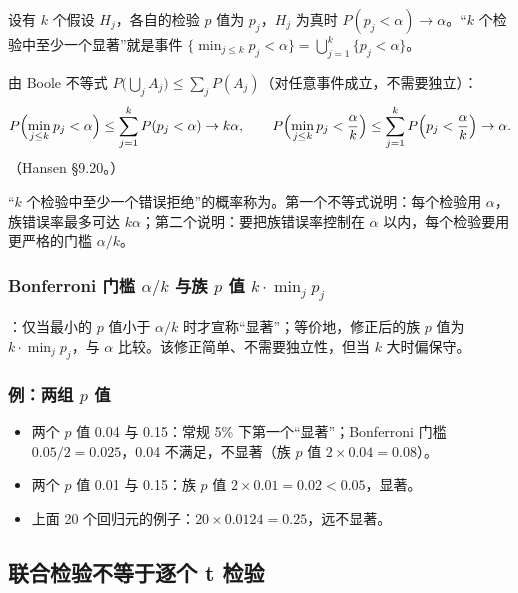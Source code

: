 设有 $k$ 个假设 $H_j$，各自的检验 $p$ 值为 $p_j$，$H_j$ 为真时 $P(p_j<\alpha)\to\alpha$。“$k$ 个检验中至少一个显著”就是事件 $\{\min_{j\le k}p_j<\alpha\}=\bigcup_{j=1}^k\{p_j<\alpha\}$。

\begin{thm}[Bonferroni 界]\label{thm:U06b-bonf}
由 Boole 不等式 $P\bigl(\bigcup_jA_j\bigr)\le\sum_jP(A_j)$（对任意事件成立，不需要独立）：
\[
P\Bigl(\min_{j\le k}p_j<\alpha\Bigr)\le\sum_{j=1}^kP(p_j<\alpha)\to k\alpha,\qquad
P\Bigl(\min_{j\le k}p_j<\frac{\alpha}{k}\Bigr)\le\sum_{j=1}^kP\Bigl(p_j<\frac\alpha k\Bigr)\to\alpha .
\]
（Hansen §9.20。）
\end{thm}

“$k$ 个检验中至少一个错误拒绝”的概率称为。第一个不等式说明：每个检验用 $\alpha$，族错误率最多可达 $k\alpha$；第二个说明：要把族错误率控制在 $\alpha$ 以内，每个检验要用更严格的门槛 $\alpha/k$。

\subsubsection{Bonferroni 门槛 \texorpdfstring{$\alpha/k$}{alpha/k} 与族 \texorpdfstring{$p$}{p} 值 \texorpdfstring{$k\cdot\min_j p_j$}{k min p}}

：仅当最小的 $p$ 值小于 $\alpha/k$ 时才宣称“显著”；等价地，修正后的族 $p$ 值为 $k\cdot\min_jp_j$，与 $\alpha$ 比较。该修正简单、不需要独立性，但当 $k$ 大时偏保守。

\subsubsection{例：两组 \texorpdfstring{$p$}{p} 值}

\begin{itemize}
  \item 两个 $p$ 值 0.04 与 0.15：常规 5\% 下第一个“显著”；Bonferroni 门槛 $0.05/2=0.025$，0.04 不满足，不显著（族 $p$ 值 $2\times0.04=0.08$）。
  \item 两个 $p$ 值 0.01 与 0.15：族 $p$ 值 $2\times0.01=0.02<0.05$，显著。
  \item 上面 20 个回归元的例子：$20\times0.0124=0.25$，远不显著。
\end{itemize}

\subsection{联合检验不等于逐个 t 检验}

